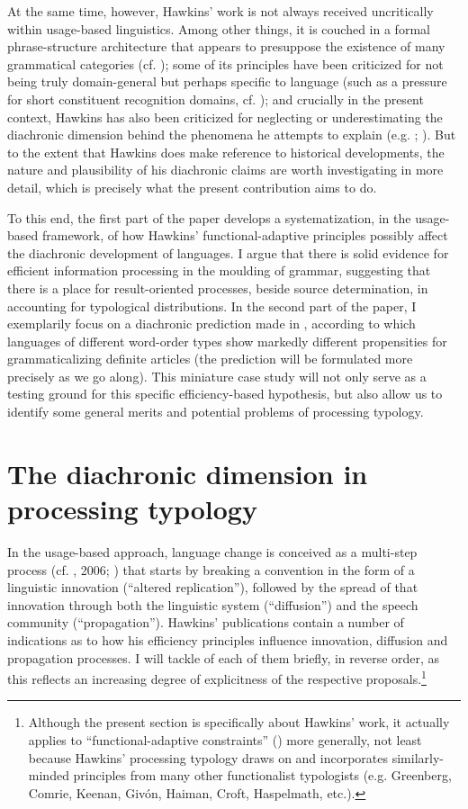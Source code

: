 \documentclass[output=paper]{langsci/langscibook}
\begin{document}
At the same time, however, Hawkins’ work is not always received uncritically within usage-based linguistics. Among other things, it is couched in a formal phrase-structure architecture that appears to presuppose the existence of many grammatical categories (cf. \citealt{Diessel2016}); some of its principles have been criticized for not being truly domain-general but perhaps specific to language (such as a pressure for short constituent recognition domains, cf. \citealt{Bybee2010}); and crucially in the present context, Hawkins has also been criticized for neglecting or underestimating the diachronic dimension behind the phenomena he attempts to explain (e.g. \citealt{Cristofaro2017}; ). But to the extent that Hawkins does make reference to historical developments, the nature and plausibility of his diachronic claims are worth investigating in more detail, which is precisely what the present contribution aims to do. 

To this end, the first part of the paper develops a systematization, in the usage-based framework, of how Hawkins’ functional-adaptive principles possibly affect the diachronic development of languages. I argue that there is solid evidence for efficient information processing in the moulding of grammar, suggesting that there is a place for result-oriented processes, beside source determination, in accounting for typological distributions. In the second part of the paper, I exemplarily focus on a diachronic prediction made in \citet{Hawkins2014_VarEff}, according to which languages of different word-order types show markedly different propensities for grammaticalizing definite articles (the prediction will be formulated more precisely as we go along). This miniature case study will not only serve as a testing ground for this specific efficiency-based hypothesis, but also allow us to identify some general merits and potential problems of processing typology.

\section{ The diachronic dimension in processing typology} 

In the usage-based approach, language change is conceived as a multi-step process (cf. \citealt{Croft2000}, 2006; \citealt{Aitchison2013}) that starts by breaking a convention in the form of a linguistic innovation (“altered replication”), followed by the spread of that innovation through both the linguistic system (“diffusion”) and the speech community (“propagation”). Hawkins’ publications contain a number of indications as to how his efficiency principles influence innovation, diffusion and propagation processes. I will tackle of each of them briefly, in reverse order, as this reflects an increasing degree of explicitness of the respective proposals.\footnote{Although the present section is specifically about Hawkins’ work, it actually applies to “functional-adaptive constraints” () more generally, not least because Hawkins’ processing typology draws on and incorporates similarly-minded principles from many other functionalist typologists (e.g. Greenberg, Comrie, Keenan, Givón, Haiman, Croft, Haspelmath, etc.).}
\end{document}
